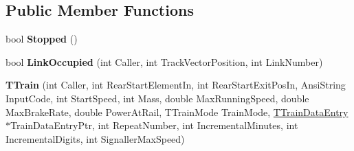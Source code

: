 \subsection*{Public Member Functions}
\begin{DoxyCompactItemize}
\item 
\mbox{\label{class_t_train_a2a2d78164c9dc1881b2c77526f04903f}} 
bool {\bfseries Stopped} ()
\item 
\mbox{\label{class_t_train_aef32cd9a007874ab09ceeac907e7c88b}} 
bool {\bfseries Link\+Occupied} (int Caller, int Track\+Vector\+Position, int Link\+Number)
\item 
\mbox{\label{class_t_train_ae9d788d7bf536de1efe7a67ab5bb8dd7}} 
{\bfseries T\+Train} (int Caller, int Rear\+Start\+Element\+In, int Rear\+Start\+Exit\+Pos\+In, Ansi\+String Input\+Code, int Start\+Speed, int Mass, double Max\+Running\+Speed, double Max\+Brake\+Rate, double Power\+At\+Rail, T\+Train\+Mode Train\+Mode, \mbox{\hyperlink{class_t_train_data_entry}{T\+Train\+Data\+Entry}} $\ast$Train\+Data\+Entry\+Ptr, int Repeat\+Number, int Incremental\+Minutes, int Incremental\+Digits, int Signaller\+Max\+Speed)
\end{DoxyCompactItemize}
